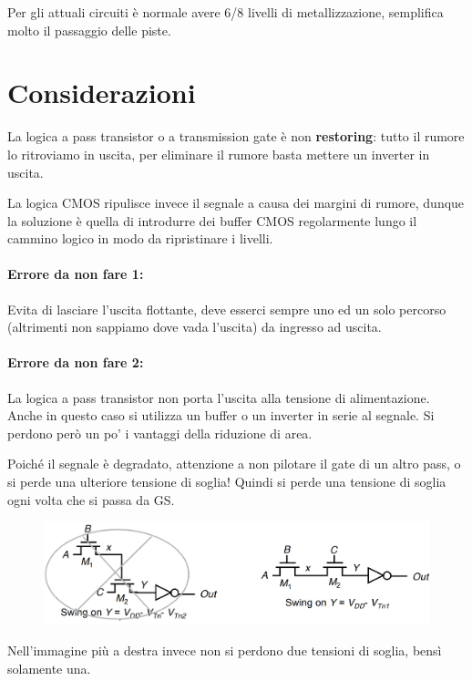 Per gli attuali circuiti è normale avere 6/8 livelli di metallizzazione, semplifica molto il passaggio delle piste.

\newpage
\section{Considerazioni}

La	logica a	pass	transistor	o	a	transmission gate	è non	\textbf{restoring}: tutto il rumore lo	ritroviamo in	uscita, per eliminare il rumore basta mettere un inverter in uscita.

La	logica CMOS	ripulisce invece il segnale a	causa dei margini di	rumore, dunque la	soluzione è quella di	introdurre dei buffer	CMOS	 regolarmente lungo il cammino logico in	modo da	ripristinare i livelli.


\paragraph{Errore da non fare 1: }

Evita di lasciare l'uscita flottante, deve esserci sempre uno ed un solo percorso (altrimenti non sappiamo dove vada l'uscita) da ingresso ad uscita.


\paragraph{Errore da non fare 2:}
La	logica a	pass	transistor	non	porta	l'uscita alla tensione di	alimentazione. Anche in	questo caso si utilizza un	buffer	o	un	inverter	in	serie al	segnale. Si	perdono però un	po'	i vantaggi della riduzione di	area. 

Poiché il segnale è degradato,	attenzione a	non	pilotare il gate di	un	altro pass,	o	si perde una ulteriore tensione di	soglia! Quindi si perde una tensione di soglia ogni volta che si passa da GS.


\begin{figure}[htbp]
    \centering
    \includegraphics[width=0.75\linewidth]{img/non_fare.png}  
    
\end{figure}

Nell'immagine più a destra invece non si perdono due tensioni di soglia, bensì solamente una.
